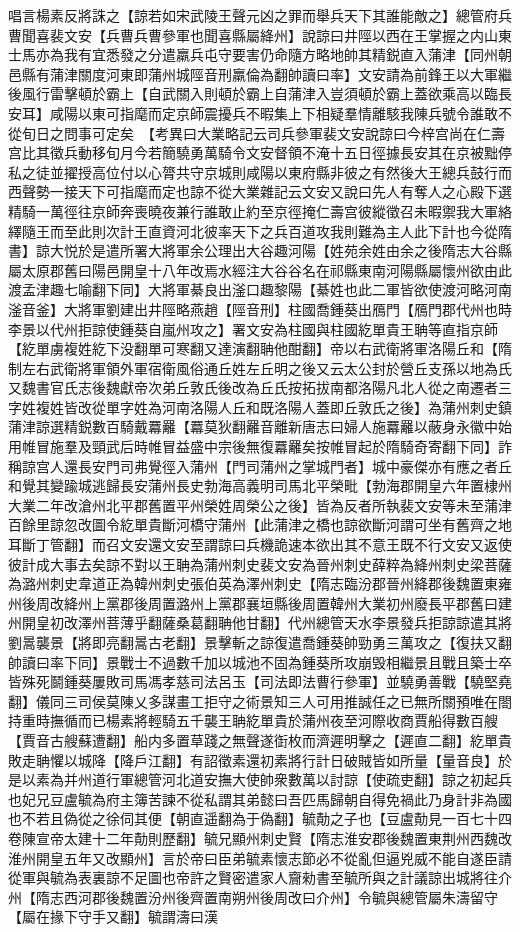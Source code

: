 唱言楊素反將誅之【諒若如宋武陵王聲元凶之罪而舉兵天下其誰能敵之】總管府兵曹聞喜裴文安【兵曹兵曹參軍也聞喜縣屬絳州】說諒曰井陘以西在王掌握之内山東士馬亦為我有宜悉發之分遣羸兵屯守要害仍命隨方略地帥其精鋭直入蒲津【同州朝邑縣有蒲津關度河東即蒲州城陘音刑羸倫為翻帥讀曰率】文安請為前鋒王以大軍繼後風行雷擊頓於霸上【自武關入則頓於霸上自蒲津入豈須頓於霸上蓋欲乘高以臨長安耳】咸陽以東可指麾而定京師震擾兵不暇集上下相疑羣情離駭我陳兵號令誰敢不從旬日之問事可定矣　【考異曰大業略記云司兵參軍裴文安說諒曰今梓宫尚在仁壽宫比其徵兵動移旬月今若簡驍勇萬騎令文安督領不淹十五日徑據長安其在京被黜停私之徒並擢授高位付以心膂共守京城則咸陽以東府縣非彼之有然後大王總兵鼓行而西聲勢一接天下可指麾而定也諒不從大業雜記云文安又說曰先人有奪人之心殿下選精騎一萬徑往京師奔喪曉夜兼行誰敢止約至京徑掩仁壽宫彼縱徵召未暇禦我大軍絡繹隨王而至此則次計王直資河北彼率天下之兵百道攻我則難為主人此下計也今從隋書】諒大悦於是遣所署大將軍余公理出大谷趣河陽【姓苑余姓由余之後隋志大谷縣屬太原郡舊曰陽邑開皇十八年改焉水經注大谷谷名在祁縣東南河陽縣屬懷州欲由此渡孟津趣七喻翻下同】大將軍綦良出滏口趣黎陽【綦姓也此二軍皆欲使渡河略河南滏音釜】大將軍劉建出井陘略燕趙【陘音刑】柱國喬鍾葵出鴈門【鴈門郡代州也時李景以代州拒諒使鍾葵自嵐州攻之】署文安為柱國與柱國紇單貴王聃等直指京師【紇單虜複姓紇下没翻單可寒翻又達演翻聃他酣翻】帝以右武衛將軍洛陽丘和【隋制左右武衛將軍領外軍宿衛風俗通丘姓左丘明之後又云太公封於營丘支孫以地為氏又魏書官氏志後魏獻帝次弟丘敦氏後改為丘氏按拓拔南都洛陽凡北人從之南遷者三字姓複姓皆改從單字姓為河南洛陽人丘和既洛陽人蓋即丘敦氏之後】為蒲州刺史鎮蒲津諒選精鋭數百騎戴羃䍦【羃莫狄翻䍦音離新唐志曰婦人施羃䍦以蔽身永徽中始用帷冒施羣及頸武后時帷冒益盛中宗後無復羃䍦矣按帷冒起於隋騎奇寄翻下同】詐稱諒宫人還長安門司弗覺徑入蒲州【門司蒲州之掌城門者】城中豪傑亦有應之者丘和覺其變踰城逃歸長安蒲州長史勃海高義明司馬北平榮毗【勃海郡開皇六年置棣州大業二年改滄州北平郡舊置平州榮姓周榮公之後】皆為反者所執裴文安等未至蒲津百餘里諒忽改圖令紇單貴斷河橋守蒲州【此蒲津之橋也諒欲斷河謂可坐有舊齊之地耳斷丁管翻】而召文安還文安至謂諒曰兵機詭速本欲出其不意王既不行文安又返使彼計成大事去矣諒不對以王聃為蒲州刺史裴文安為晉州刺史薛粹為絳州刺史梁菩薩為潞州刺史韋道正為韓州刺史張伯英為澤州刺史【隋志臨汾郡晉州絳郡後魏置東雍州後周改絳州上黨郡後周置潞州上黨郡襄垣縣後周置韓州大業初州廢長平郡舊曰建州開皇初改澤州菩薄乎翻薩桑葛翻聃他甘翻】代州總管天水李景發兵拒諒諒遣其將劉暠襲景【將即亮翻暠古老翻】景擊斬之諒復遣喬鍾葵帥勁勇三萬攻之【復扶又翻帥讀曰率下同】景戰士不過數千加以城池不固為鍾葵所攻崩毁相繼景且戰且築士卒皆殊死鬬鍾葵屢敗司馬馮孝慈司法呂玉【司法即法曹行參軍】並驍勇善戰【驍堅堯翻】儀同三司侯莫陳乂多謀畫工拒守之術景知三人可用推誠任之已無所關預唯在閤持重時撫循而已楊素將輕騎五千襲王聃紇單貴於蒲州夜至河際收商賈船得數百艘【賈音古艘蘇遭翻】船内多置草踐之無聲遂衘枚而濟遲明擊之【遲直二翻】紇單貴敗走聃懼以城降【降戶江翻】有詔徵素還初素將行計日破賊皆如所量【量音良】於是以素為并州道行軍總管河北道安撫大使帥衆數萬以討諒【使疏吏翻】諒之初起兵也妃兄豆盧毓為府主簿苦諫不從私謂其弟懿曰吾匹馬歸朝自得免禍此乃身計非為國也不若且偽從之徐伺其便【朝直遥翻為于偽翻】毓勣之子也【豆盧勣見一百七十四卷陳宣帝太建十二年勣則歷翻】毓兄顯州刺史賢【隋志淮安郡後魏置東荆州西魏改淮州開皇五年又改顯州】言於帝曰臣弟毓素懷志節必不從亂但逼兇威不能自遂臣請從軍與毓為表裏諒不足圖也帝許之賢密遣家人齎勑書至毓所與之計議諒出城將往介州【隋志西河郡後魏置汾州後齊置南朔州後周改曰介州】令毓與總管屬朱濤留守【屬在掾下守手又翻】毓謂濤曰漢